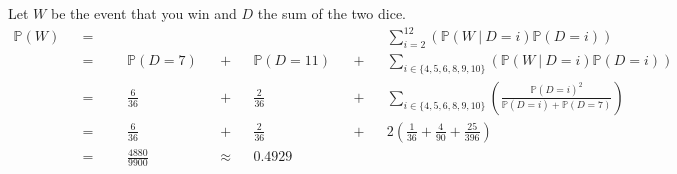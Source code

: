 \documentclass{article}
\newcommand{\ssor}{\ |\ }
\newcommand{\prob}[1]{\mathbb{P}\left(#1\right)}
\newcommand{\conprob}[2]{\prob{#1\ssor#2}}
\begin{document}
\noindent Let $W$ be the event that you win and $D$ the sum of the two dice.
\begin{align*}
\prob{W} 	&&= &&&&&&&&&&&\sum_{i=2}^{12} \left(\conprob{W}{D=i}\prob{D=i}\right) \\
			&&= &&&\prob{D=7} &&+ &&\prob{D=11} &&+ &&\sum_{i \in \{4,5,6,8,9,10\}} \left(\conprob{W}{D=i}\prob{D=i}\right) \\
			&&= &&&\frac{6}{36} &&+ &&\frac{2}{36} &&+ &&\sum_{i \in \{4,5,6,8,9,10\}} \left(\frac{\prob{D=i}^2}{\prob{D=i}+\prob{D=7}}\right) \\
			&&= &&&\frac{6}{36} &&+ &&\frac{2}{36} &&+ &&2\left(\frac{1}{36} + \frac{4}{90} + \frac{25}{396}\right) \\
			&&= &&&\frac{4880}{9900} &&\approx &&0.4929
\end{align*}
\end{document}
